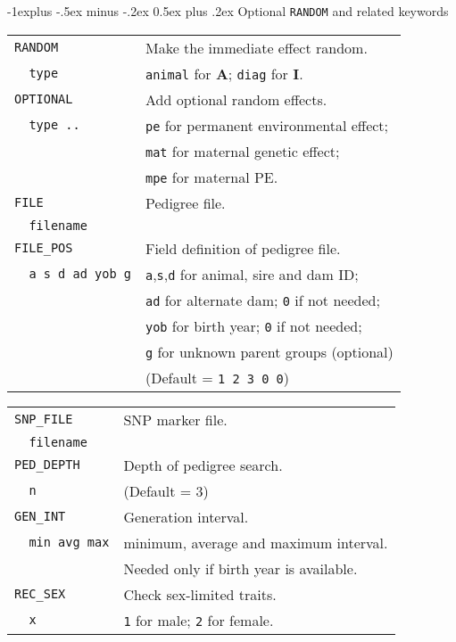 \documentclass[10pt,landscape]{article}
\makeatletter
\renewcommand{\subsection}{\@startsection{subsection}{2}{0mm}%
                                {-1explus -.5ex minus -.2ex}%
                                {0.5ex plus .2ex}%
                                {\normalfont\normalsize\bfseries}}
\makeatother
\begin{document}
\begin{multicols}{3}
\subsection{Optional \texttt{RANDOM} and related keywords}
\begin{tabular}{@{}ll@{}}
  \verb|RANDOM|  & Make the immediate effect random.\\
  \verb|  type|  & \verb|animal| for $\mathbf{A}$; \verb|diag| for $\mathbf{I}$.\\
  \verb|OPTIONAL| & Add optional random effects.\\
  \verb|  type ..| & \verb|pe| for permanent environmental effect;\\
                  & \verb|mat| for maternal genetic effect;\\
                  & \verb|mpe| for maternal PE.\\
  \verb|FILE|  & Pedigree file.\\
  \verb|  filename|  & \\
  \verb|FILE_POS| & Field definition of pedigree file.\\
  \verb|  a s d ad yob g| & \verb|a|,\verb|s|,\verb|d| for animal, sire and dam ID;\\
                        & \verb|ad| for alternate dam; \verb|0| if not needed;\\
                        & \verb|yob| for birth year; \verb|0| if not needed;\\
                        & \verb|g| for unknown parent groups (optional)\\
                        & (Default = \verb|1 2 3 0 0|)\\
\end{tabular}
\begin{tabular}{@{}ll@{}}
  \verb|SNP_FILE|  & SNP marker file.\\
  \verb|  filename|  & \\
  \verb|PED_DEPTH|  & Depth of pedigree search.\\
  \verb|  n|       & (Default = 3)\\
  \verb|GEN_INT|  & Generation interval.\\
  \verb|  min avg max| & minimum, average and maximum interval.\\
                     & Needed only if birth year is available.\\
  \verb|REC_SEX|  & Check sex-limited traits.\\
  \verb|  x|  & \verb|1| for male; \verb|2| for female.\\

\end{tabular}
\end{multicols}
\end{document}
